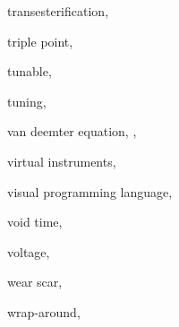 \begin{theindex}
  \item \lowercase {transesterification}, 
  \item \lowercase {triple point}, 
  \item \lowercase {tunable}, 
  \item \lowercase {tuning}, 
  \item \lowercase {van Deemter equation}, , 
  \item \lowercase {virtual instruments}, 
  \item \lowercase {visual programming language}, 
  \item \lowercase {void time}, 
  \item \lowercase {voltage}, 
  \item \lowercase {wear scar}, 
  \item \lowercase {wrap-around}, 

\end{theindex}

